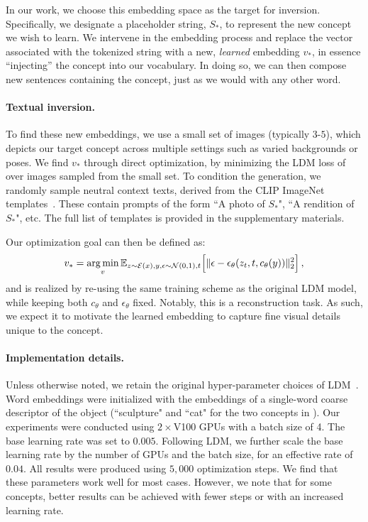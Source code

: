 In our work, we choose this embedding space as the target for inversion. Specifically, we designate a placeholder string, $S_*$, to represent the new concept we wish to learn. 
We intervene in the embedding process and replace the vector associated with the tokenized string with a new,  \textit{learned} embedding $v_*$, in essence ``injecting'' the concept into our vocabulary. In doing so, we can then compose new sentences containing the concept, just as we would with any other word. %

\paragraph{Textual inversion.}
To find these new embeddings, we use a small set of images (typically $3$-$5$), which depicts our target concept across multiple settings such as varied backgrounds or poses. We find $v_*$ through direct optimization, by minimizing the LDM loss of  over images sampled from the small set. To condition the generation, we randomly sample neutral context texts, derived from the CLIP ImageNet templates~\citep{radford2021learning}. These contain prompts of the form ``A photo of $S_*$", ``A rendition of $S_*$", etc. The full list of templates is provided in the supplementary materials.

Our optimization goal can then be defined as:
\begin{equation}
   v_* = \operatorname*{arg\,min}_v \mathbb{E}_{z\sim\mathcal{E}(x), y, \epsilon \sim \mathcal{N}(0, 1), t }\Big[ \Vert \epsilon - \epsilon_\theta(z_{t},t, c_\theta(y)) \Vert_{2}^{2}\Big] \, ,
    \label{eq:v_opt}
\end{equation}
and is realized by re-using the same training scheme as the original LDM model, while keeping both $c_\theta$ and $\epsilon_\theta$ fixed. Notably, this is a reconstruction task. As such, we expect it to motivate the learned embedding to capture fine visual details unique to the concept.

\paragraph{Implementation details.}
Unless otherwise noted, we retain the original hyper-parameter choices of LDM~\citep{rombach2021highresolution}. Word embeddings were initialized with the embeddings of a single-word coarse descriptor of the object (\eg ``sculpture" and ``cat" for the two concepts in ). Our experiments were conducted using $2\times$V100 GPUs with a batch size of 4. The base learning rate was set to $0.005$. Following LDM, we further scale the base learning rate by the number of GPUs and the batch size, for an effective rate of $0.04$. All results were produced using $5,000$ optimization steps. We find that these parameters work well for most cases. However, we note that for some concepts, better results can be achieved with fewer steps or with an increased learning rate.
